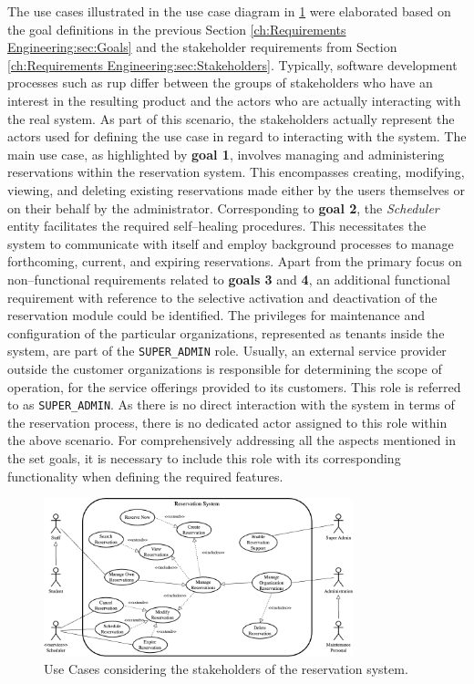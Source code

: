 The use cases illustrated in the use case diagram in \ref{fig:use-cases} were elaborated based on the goal definitions in the previous Section \ref{ch:Requirements Engineering:sec:Goals} and the stakeholder requirements from Section \ref{ch:Requirements Engineering:sec:Stakeholders}.
Typically, software development processes such as \acrshort{rup} \cite{kruchten_rational_1999} differ between the groups of stakeholders who have an interest in the resulting product and the actors who are actually interacting with the real system. 
As part of this scenario, the stakeholders actually represent the actors used for defining the use case in regard to interacting with the system.
The main use case, as highlighted by \textbf{goal 1}, involves managing and administering reservations within the reservation system. This encompasses creating, modifying, viewing, and deleting existing reservations made either by the users themselves or on their behalf by the administrator.
Corresponding to \textbf{goal 2}, the \textit{Scheduler} entity facilitates the required self--healing procedures. This necessitates the system to communicate with itself and employ background processes to manage forthcoming, current, and expiring reservations.
Apart from the primary focus on non--functional requirements related to \textbf{goals 3} and \textbf{4}, an additional functional requirement with reference to the selective activation and deactivation of the reservation module could be identified.
The privileges for maintenance and configuration of the particular organizations, represented as tenants inside the system, are part of the \verb|SUPER_ADMIN| role.
Usually, an external service provider outside the customer organizations is responsible for determining the scope of operation, for the service offerings provided to its customers. This role is referred to as \verb|SUPER_ADMIN|. As there is no direct interaction with the system in terms of the reservation process, there is no dedicated actor assigned to this role within the above scenario.
For comprehensively addressing all the aspects mentioned in the set goals, it is necessary to include this role with its corresponding functionality when defining the required features.

\begin{figure}[h]
    \centering
    \includegraphics[width=0.8\textwidth,keepaspectratio]{resources/images/main/2_requirements_engineering/UseCases.png}
    \caption{Use Cases considering the stakeholders of the reservation system.}
    \label{fig:use-cases}
\end{figure}
